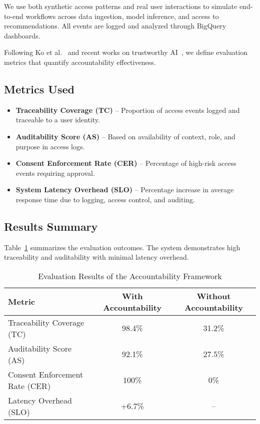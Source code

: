 \documentclass[acmsmall]{acmart}
\begin{document}
We use both synthetic access patterns and real user interactions to simulate end-to-end workflows across data ingestion, model inference, and access to recommendations. All events are logged and analyzed through BigQuery dashboards.

Following Ko et al.~\cite{ko2011cloud} and recent works on trustworthy AI~\cite{anastasia2021accountability}, we define evaluation metrics that quantify accountability effectiveness.

\subsection{Metrics Used}

\begin{itemize}
    \item \textbf{Traceability Coverage (TC)} – Proportion of access events logged and traceable to a user identity.
    \item \textbf{Auditability Score (AS)} – Based on availability of context, role, and purpose in access logs.
    \item \textbf{Consent Enforcement Rate (CER)} – Percentage of high-risk access events requiring approval.
    \item \textbf{System Latency Overhead (SLO)} – Percentage increase in average response time due to logging, access control, and auditing.
\end{itemize}

\subsection{Results Summary}

Table~\ref{tab:evaluation_results} summarizes the evaluation outcomes. The system demonstrates high traceability and auditability with minimal latency overhead.

\begin{table}[h]
\centering
\caption{Evaluation Results of the Accountability Framework}
\label{tab:evaluation_results}
\begin{tabular}{|l|c|c|}
\hline
\textbf{Metric} & \textbf{With Accountability} & \textbf{Without Accountability} \\
\hline
Traceability Coverage (TC) & 98.4\% & 31.2\% \\
Auditability Score (AS) & 92.1\% & 27.5\% \\
Consent Enforcement Rate (CER) & 100\% & 0\% \\
Latency Overhead (SLO) & +6.7\% & -- \\
\hline
\end{tabular}
\end{table}
\end{document}
